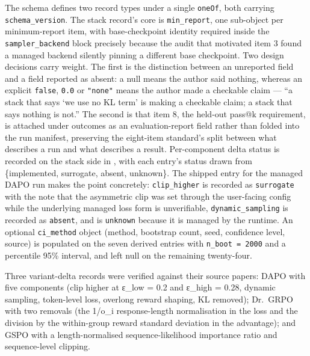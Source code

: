 \documentclass[12pt,a4paper]{report}
\newcommand{\longtok}[1]{\texttt{\seqsplit{#1}}}
\begin{document}
The schema defines two record types under a single \texttt{oneOf}, both
carrying \texttt{schema\_version}. The stack record's core is
\texttt{min\_report}, one sub-object per minimum-report item, with
base-checkpoint identity required inside the \texttt{sampler\_backend}
block precisely because the audit that motivated item 3 found a managed
backend silently pinning a different base checkpoint. Two design
decisions carry weight. The first is the distinction between an
unreported field and a field reported as absent: a null means the author
said nothing, whereas an explicit \texttt{false}, \texttt{0.0} or
\texttt{"none"} means the author made a checkable claim --- ``a stack
that says `we use no KL term' is making a checkable claim; a stack that
says nothing is not.'' The second is that item 8, the held-out pass@k
requirement, is attached under outcomes as an evaluation-report field
rather than folded into the run manifest, preserving the eight-item
standard's split between what describes a run and what describes a
result. Per-component delta status is recorded on the stack side in
\longtok{variant\_\allowbreak{}deltas\_\allowbreak{}applied}, with each entry's status drawn from
\{implemented, surrogate, absent, unknown\}. The shipped entry for the
managed DAPO run makes the point concretely: \texttt{clip\_higher} is
recorded as \texttt{surrogate} with the note that the asymmetric clip
was set through the user-facing config while the underlying managed loss
form is unverifiable, \texttt{dynamic\_sampling} is recorded as
\texttt{absent}, and \longtok{token\_\allowbreak{}level\_\allowbreak{}loss} is \texttt{unknown}
because it is managed by the runtime. An optional \texttt{ci\_method}
object (method, bootstrap count, seed, confidence level, source) is
populated on the seven derived entries with \texttt{n\_boot\ =\ 2000}
and a percentile 95\% interval, and left null on the remaining
twenty-four.

Three variant-delta records were verified against their source papers:
DAPO with five components (clip higher at ε\_low = 0.2 and ε\_high =
0.28, dynamic sampling, token-level loss, overlong reward shaping, KL
removed); Dr.~GRPO with two removals (the 1/\textbar o\_i\textbar{}
response-length normalisation in the loss and the division by the
within-group reward standard deviation in the advantage); and GSPO with
a length-normalised sequence-likelihood importance ratio and
sequence-level clipping.
\end{document}
